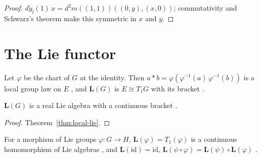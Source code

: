 \begin{proof}
  \leanok
  $d\tilde y_l(1)\,x = d^2 m((1, 1))((0, y), (x, 0))$; commutativity and Schwarz's theorem make
  this symmetric in $x$ and $y$.
\end{proof}

\section{The Lie functor}

\begin{definition}
  \label{def:lie-algebra}
  \leanok
  Let $\varphi$ be the chart of $G$ at the identity. Then
  $a * b = \varphi(\varphi^{-1}(a)\,\varphi^{-1}(b))$ is a local group law on $E$
  \cite[Remark 5.1.8]{GN26}, and $\mathbf{L}(G)$ is $E \cong T_1 G$ with its bracket
  \cite[Definition 5.1.6]{GN26}.
\end{definition}

\begin{theorem}
  \label{thm:lie-algebra}
  \leanok
  $\mathbf{L}(G)$ is a real Lie algebra with a continuous bracket \cite[Definition 5.1.6]{GN26}.
\end{theorem}

\begin{proof}
  \leanok
  Theorem~\ref{thm:local-lie}.
\end{proof}

\begin{theorem}
  \label{thm:lie-functor}
  \leanok
  For a morphism of Lie groups $\varphi\colon G \to H$, $\mathbf{L}(\varphi) = T_1(\varphi)$ is a
  continuous homomorphism of Lie algebras \cite[Proposition 5.1.10]{GN26}, and
  $\mathbf{L}(\mathrm{id}) = \mathrm{id}$, $\mathbf{L}(\psi \circ \varphi) = \mathbf{L}(\psi)
  \circ \mathbf{L}(\varphi)$ \cite[Corollary 5.1.11]{GN26}.
\end{theorem}

